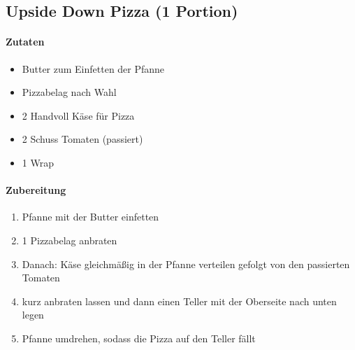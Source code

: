 \newpage
\subsection{Upside Down Pizza (1 Portion)}
\paragraph{Zutaten}
\begin{itemize}[noitemsep]
	\item Butter zum Einfetten der Pfanne
	\item Pizzabelag nach Wahl
	\item 2 Handvoll Käse für Pizza
	\item 2 Schuss Tomaten (passiert)
	\item 1 Wrap
\end{itemize}
\paragraph{Zubereitung}
\begin{enumerate}[noitemsep]
	\item Pfanne mit der Butter einfetten
	\item 1 Pizzabelag anbraten
	\item Danach: Käse gleichmäßig in der Pfanne verteilen gefolgt von den passierten Tomaten
	\item kurz anbraten lassen und dann einen Teller mit der Oberseite nach unten legen
	\item Pfanne umdrehen, sodass die Pizza auf den Teller fällt
\end{enumerate}
